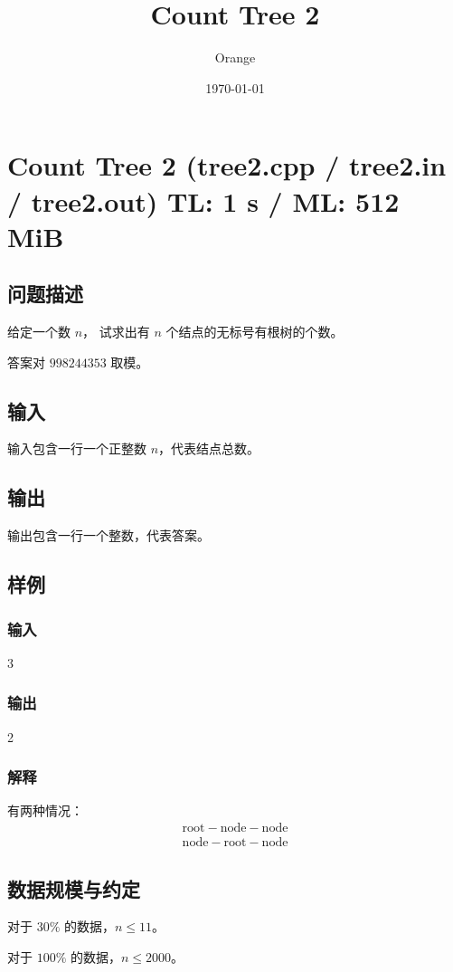 \documentclass[UTF8]{article}
\title{Count Tree 2}
\author{Orange}
\date{\today}
\begin{document}
	\heiti

	\section{Count Tree 2 \small(tree2.cpp / tree2.in / tree2.out) TL: 1 s / ML: 512 MiB}
	\subsection{问题描述}
	给定一个数 $n$，
	试求出有 $n$ 个结点的无标号有根树的个数。

	答案对 $998244353$ 取模。

	\subsection{输入}
	输入包含一行一个正整数 $n$，代表结点总数。

	\subsection{输出}
	输出包含一行一个整数，代表答案。

	\subsection{样例}
	\subsubsection{输入}
	3

	\subsubsection{输出}
	2

	\subsubsection{解释}
	有两种情况：
	\begin{gather*}
		\mathrm{root} - \mathrm{node} - \mathrm{node}
		\\
		\mathrm{node} - \mathrm{root} - \mathrm{node}
	\end{gather*}

	\subsection{数据规模与约定}
	对于 $30\%$ 的数据，$n \le 11$。

	对于 $100\%$ 的数据，$n \le 2000$。
\end{document}

